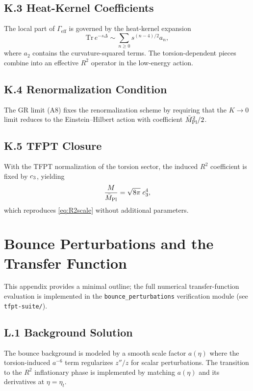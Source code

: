 \subsection{K.3 Heat-Kernel Coefficients}
The local part of $\Gamma_{\mathrm{eff}}$ is governed by the heat-kernel expansion
\begin{equation}
    \mathrm{Tr}\,e^{-s\Delta} \sim \sum_{n\ge 0} s^{(n-4)/2} a_n,
\end{equation}
where $a_2$ contains the curvature-squared terms. The torsion-dependent pieces combine into
an effective $R^2$ operator in the low-energy action.

\subsection{K.4 Renormalization Condition}
The GR limit (A8) fixes the renormalization scheme by requiring that the $K\to 0$ limit
reduces to the Einstein--Hilbert action with coefficient $\bar{M}_{\mathrm{Pl}}^2/2$.

\subsection{K.5 TFPT Closure}
With the TFPT normalization of the torsion sector, the induced $R^2$ coefficient is fixed by
$c_3$, yielding
\begin{equation}
    \frac{M}{\bar{M}_{\mathrm{Pl}}}=\sqrt{8\pi}\;c_3^4,
\end{equation}
which reproduces \eqref{eq:R2scale} without additional parameters.

\section{Bounce Perturbations and the Transfer Function}
\label{app:bounce}

\begin{tcolorbox}[colback=gray!5, colframe=gray!60, 
    title={\textbf{Status Note}}, fonttitle=\bfseries\small]
This appendix provides a minimal outline; the full numerical transfer-function evaluation
is implemented in the \texttt{bounce\_perturbations} verification module (see \texttt{tfpt-suite/}).
\end{tcolorbox}

\subsection{L.1 Background Solution}
The bounce background is modeled by a smooth scale factor $a(\eta)$ where the torsion-induced
$a^{-6}$ term regularizes $z''/z$ for scalar perturbations. The transition to the $R^2$
inflationary phase is implemented by matching $a(\eta)$ and its derivatives at $\eta=\eta_t$.

